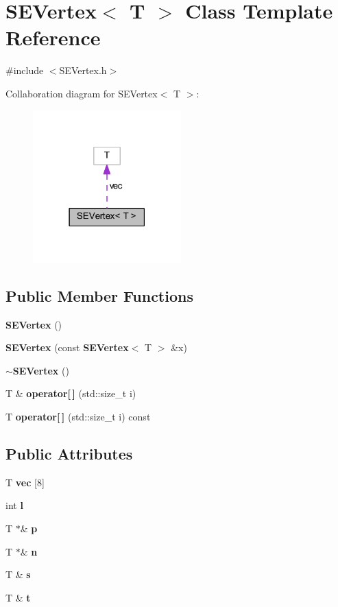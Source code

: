 \section{S\+E\+Vertex$<$ T $>$ Class Template Reference}
\label{class_s_e_vertex}


{\ttfamily \#include $<$S\+E\+Vertex.\+h$>$}



Collaboration diagram for S\+E\+Vertex$<$ T $>$\+:
\nopagebreak
\begin{figure}[H]
\begin{center}
\leavevmode
\includegraphics[width=162pt]{class_s_e_vertex__coll__graph}
\end{center}
\end{figure}
\subsection*{Public Member Functions}
\begin{DoxyCompactItemize}
\item 
{\bf S\+E\+Vertex} ()
\item 
{\bf S\+E\+Vertex} (const {\bf S\+E\+Vertex}$<$ T $>$ \&x)
\item 
{\bf $\sim$\+S\+E\+Vertex} ()
\item 
T \& {\bf operator[$\,$]} (std\+::size\+\_\+t i)
\item 
T {\bf operator[$\,$]} (std\+::size\+\_\+t i) const 
\end{DoxyCompactItemize}
\subsection*{Public Attributes}
\begin{DoxyCompactItemize}
\item 
T {\bf vec} [8]
\item 
int {\bf l}
\item 
T $\ast$\& {\bf p}
\item 
T $\ast$\& {\bf n}
\item 
T \& {\bf s}
\item 
T \& {\bf t}
\end{DoxyCompactItemize}


